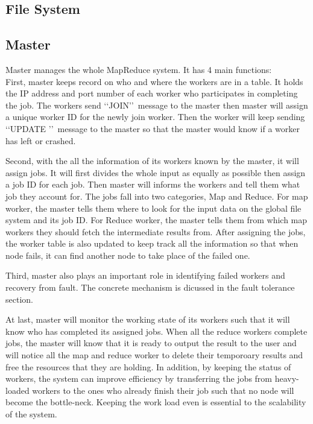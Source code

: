 \documentclass[12pt]{article}
\begin{document}
\subsection{File System}
\subsection{Master}

Master manages the whole MapReduce system. It has 4 main functions: \\
First, master keeps record on who and where the workers are in a table. It holds the IP address and 
port number of each worker who participates in completing the job. The workers send \lq\lq JOIN\rq\rq\  
message to the master then master will assign a unique worker ID for the newly join worker.
Then the worker will keep sending \lq\lq UPDATE \rq\rq\ message to the master so that the master would know
if a worker has left or crashed.
  
Second, with the all the information of its workers known by the master, it will assign jobs. It will
first divides the whole input as equally as possible then assign a job ID for each job. Then master will informs the workers and tell them 
what job they account for. The jobs fall into two categories, Map and Reduce. For map worker, the master tells
them where to look for the input data on the global file system and its job ID. For Reduce worker, the master tells
them from which map workers they should fetch the intermediate results from. After assigning the jobs, the worker table
is also updated to keep track all the information so that when node fails, it can find another node to take place of the 
failed one.

Third, master also plays an important role in identifying failed workers and recovery from fault. The concrete mechanism
is dicussed in the fault tolerance section.

At last, master will monitor the working state of its workers such that it will know who has completed its assigned jobs. When all 
the reduce workers complete jobs, the master will know that it is ready to output the result to the user and will notice all the map and
reduce worker to delete their temporoary results and free the resources that they are holding. In addition, by keeping the status of workers,
the system can improve efficiency by transferring the jobs from heavy-loaded workers to the ones who already finish their job such that no
node will become the bottle-neck. Keeping the work load even is essential to the scalability of the system.   
\end{document}

